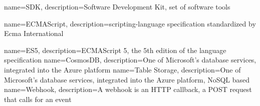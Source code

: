 {
	name=SDK,
	description={Software Development Kit, set of software tools}
}

{
	name=ECMAScript,
	description={scripting-language specification standardized by Ecma International}
}

{
	name=ES5,
	description={ECMAScript 5, the 5th edition of the language specification}
}
{
	name=CosmosDB,
	description={One of Microsoft's database services, integrated into the Azure platform}
}
{
	name=Table Storage,
	description={One of Microsoft's database services, integrated into the Azure platform, NoSQL based}
}
{
	name=Webhook,
	description={A webhook is an HTTP callback, a POST request that calls for an event}
}